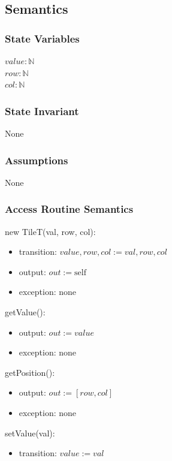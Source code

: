 \documentclass[12pt]{article}
\begin{document}
\subsection* {Semantics}

\subsubsection* {State Variables}
$value : \mathbb{N}$\\   
$row : \mathbb{N}$\\
$col : \mathbb{N}$\\

\subsubsection* {State Invariant}

None

\subsubsection* {Assumptions}

None

\subsubsection* {Access Routine Semantics}

\noindent new TileT(val, row, col):
\begin{itemize}
\item transition: $value, row, col := val, row, col$
\item output: $out := \mbox{self}$
\item exception: none
\end{itemize}

\noindent getValue():
\begin{itemize}
\item output: $out := value$
\item exception: none
\end{itemize}

\noindent getPosition():
\begin{itemize}
\item output: $out := [row, col]$
\item exception: none
\end{itemize}

\noindent setValue(val):
\begin{itemize}
\item transition: $value := val$ 
\end{itemize}
\end{document}
